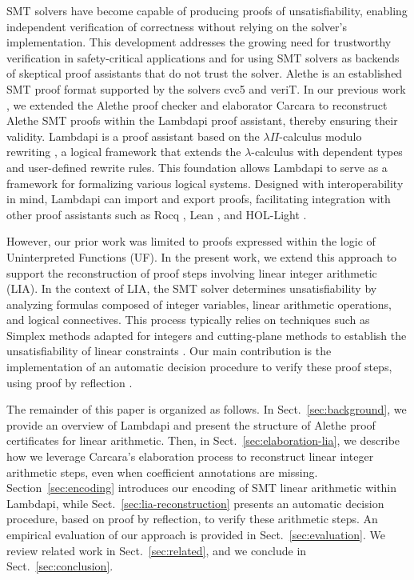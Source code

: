 \documentclass[runningheads,envcountsame]{llncs}
\begin{document}
SMT solvers have become capable of producing proofs of unsatisfiability,  enabling independent verification of correctness without relying on the solver's implementation.
This development addresses the growing need for trustworthy verification in safety-critical applications and for using SMT solvers as backends of skeptical proof assistants that do not trust the solver.
Alethe \cite{alethe,alethespec} is an established SMT proof format supported by the solvers cvc5 and veriT. In our previous work \cite{ColtellacciMD24}, we extended the Alethe proof checker and elaborator Carcara \cite{carcara} to
reconstruct Alethe SMT proofs within the Lambdapi proof assistant, thereby ensuring their validity.
Lambdapi \cite{lambdapi} is a proof assistant based on the $\lambda\Pi$-calculus modulo rewriting \cite{lpmodulo}, a logical framework \cite{lf} that extends the $\lambda$-calculus with dependent types and user-defined rewrite rules.
This foundation allows Lambdapi to serve as a framework for formalizing various logical systems.
Designed with interoperability in mind, Lambdapi can import and export proofs, facilitating integration with other proof assistants such as Rocq \cite{Rocq-refman}, Lean \cite{lean4:2021}, and HOL-Light \cite{LPAR2024:Translating_HOL_Light_proofs}. 

However, our prior work was limited to proofs expressed within the logic of Uninterpreted Functions (UF).
In the present work, we extend this approach to support the reconstruction of proof steps involving linear integer arithmetic (LIA).
In the context of LIA, the SMT solver determines unsatisfiability by analyzing formulas composed of integer variables, linear arithmetic operations, and logical connectives.
This process typically relies on techniques such as Simplex methods adapted for integers and cutting-plane methods to establish the unsatisfiability of linear constraints \cite{SRI:simplex:dpllt}.
Our main contribution is the implementation of an automatic decision procedure to verify these proof steps, using proof by reflection \cite{reflection-origin-coq,ring-coq}.

The remainder of this paper is organized as follows.
In Sect.~\ref{sec:background}, we provide an overview of Lambdapi and present the structure of Alethe proof certificates for linear arithmetic.
Then, in Sect.~\ref{sec:elaboration-lia}, we describe how we leverage Carcara's elaboration process to reconstruct linear integer arithmetic steps, even when coefficient annotations are missing.
Section~\ref{sec:encoding} introduces our encoding of SMT linear arithmetic within Lambdapi, while Sect.~\ref{sec:lia-reconstruction} presents an automatic decision procedure, based on proof by reflection, to verify these arithmetic steps.
An empirical evaluation of our approach is provided in Sect.~\ref{sec:evaluation}. We review related work in Sect.~\ref{sec:related}, and we conclude in Sect.~\ref{sec:conclusion}.
\end{document}
